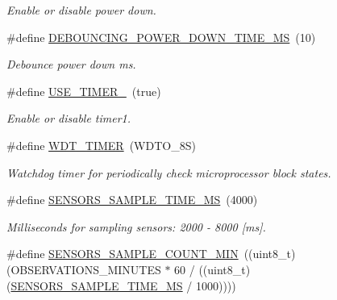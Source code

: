 \begin{DoxyCompactItemize}
\begin{DoxyCompactList}\small\item\em Enable or disable power down. \end{DoxyCompactList}\item 
\mbox{\label{i2c-th-config_8h_a7b9497e328b8f872cd7677cfd02bbf65}} 
\#define \hyperlink{i2c-th-config_8h_a7b9497e328b8f872cd7677cfd02bbf65}{D\+E\+B\+O\+U\+N\+C\+I\+N\+G\+\_\+\+P\+O\+W\+E\+R\+\_\+\+D\+O\+W\+N\+\_\+\+T\+I\+M\+E\+\_\+\+MS}~(10)
\begin{DoxyCompactList}\small\item\em Debounce power down ms. \end{DoxyCompactList}\item 
\mbox{\label{i2c-th-config_8h_a8051c2a569a9f9c488af89bce47ec306}} 
\#define \hyperlink{i2c-th-config_8h_a8051c2a569a9f9c488af89bce47ec306}{U\+S\+E\+\_\+\+T\+I\+M\+E\+R\+\_}~(true)
\begin{DoxyCompactList}\small\item\em Enable or disable timer1. \end{DoxyCompactList}\item 
\#define \hyperlink{i2c-th-config_8h_a983c9777673ee873f12ec9f489215321}{W\+D\+T\+\_\+\+T\+I\+M\+ER}~(W\+D\+T\+O\+\_\+8S)
\begin{DoxyCompactList}\small\item\em Watchdog timer for periodically check microprocessor block states. \end{DoxyCompactList}\item 
\mbox{\label{i2c-th-config_8h_a94909b75c6bbb3614c483f1d22462440}} 
\#define \hyperlink{i2c-th-config_8h_a94909b75c6bbb3614c483f1d22462440}{S\+E\+N\+S\+O\+R\+S\+\_\+\+S\+A\+M\+P\+L\+E\+\_\+\+T\+I\+M\+E\+\_\+\+MS}~(4000)
\begin{DoxyCompactList}\small\item\em Milliseconds for sampling sensors\+: 2000 -\/ 8000 \mbox{[}ms\mbox{]}. \end{DoxyCompactList}\item 
\mbox{\label{i2c-th-config_8h_a05567a696548b4a2e03c49dc893a32c8}} 
\#define \hyperlink{i2c-th-config_8h_a05567a696548b4a2e03c49dc893a32c8}{S\+E\+N\+S\+O\+R\+S\+\_\+\+S\+A\+M\+P\+L\+E\+\_\+\+C\+O\+U\+N\+T\+\_\+\+M\+IN}~((uint8\+\_\+t)(O\+B\+S\+E\+R\+V\+A\+T\+I\+O\+N\+S\+\_\+\+M\+I\+N\+U\+T\+ES $\ast$ 60 / ((uint8\+\_\+t)(\hyperlink{i2c-th-config_8h_a94909b75c6bbb3614c483f1d22462440}{S\+E\+N\+S\+O\+R\+S\+\_\+\+S\+A\+M\+P\+L\+E\+\_\+\+T\+I\+M\+E\+\_\+\+MS} / 1000))))

\end{DoxyCompactItemize}
